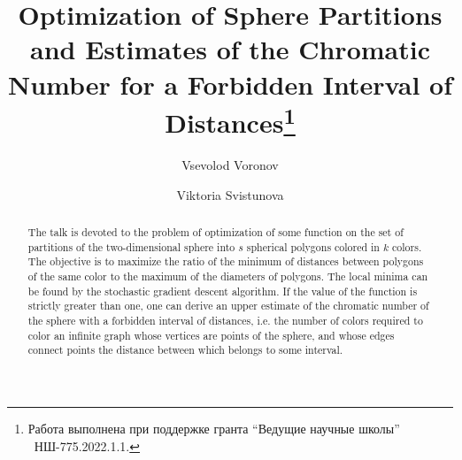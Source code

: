 \begin{englishtitle} %
\title{Optimization of Sphere Partitions and Estimates of the Chromatic Number for a Forbidden Interval of Distances\thanks{Работа выполнена при поддержке гранта ``Ведущие научные школы''  \textnumero~НШ-775.2022.1.1.}}
\author{Vsevolod Voronov 
  \and
  Viktoria Svistunova}

\maketitle

\begin{abstract}
The talk is devoted to the problem of optimization of some function on the set of partitions of the two-dimensional sphere into $s$ spherical polygons colored in $k$ colors. The objective is to maximize the ratio of the minimum of distances between polygons of the same color to the maximum of the diameters of polygons. The local minima can be found by the stochastic gradient descent algorithm. If the value of the function is strictly greater than one, one can derive an upper estimate of the chromatic number of the sphere with a forbidden interval of distances, i.e. the number of colors required to color an infinite graph whose vertices are points of the sphere, and whose edges connect points the distance between which belongs to some interval.

\end{abstract}
\end{englishtitle}


\iffalse

\documentclass[12pt]{llncs}  %


\usepackage{iftex}

\ifPDFTeX
\usepackage[T2A]{fontenc}
\usepackage[utf8]{inputenc} %
\usepackage[english,russian]{babel}
\fi



\usepackage{todonotes} %


